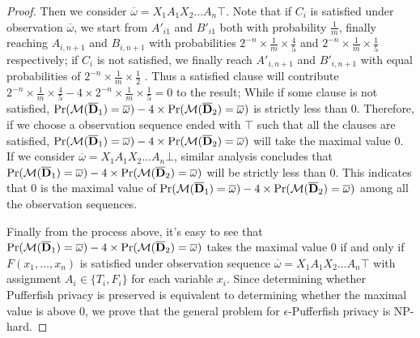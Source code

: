 \begin{proof}
  Then we consider $\overline{\omega}=X_1A_1X_2\ldots A_n \top$. Note that if $C_i$ is satisfied under observation $\overline{\omega}$, we start from $A'_{i1}$ and $B'_{i1}$ both with
  probability $\frac{1}{m}$, finally reaching $A_{i,n+1}$ and $B_{i,n+1}$ with probabilities $2^{-n} \times \frac{1}{m} \times \frac{4}{5}$
  and $2^{-n} \times \frac{1}{m} \times \frac{1}{5}$ respectively;
  if $C_i$ is not satisfied, we finally reach $A'_{i,n+1}$ and $B'_{i,n+1}$  with equal probabilities of $2^{-n}\times \frac{1}{m} \times \frac{1}{2}$ .
  Thus a satisfied clause will contribute $2^{-n} \times \frac{1}{m} \times \frac{4}{5} - 4 \times 2^{-n} \times \frac{1}{m} \times \frac{1}{5} = 0$ to
  the result; While if some clause is not satisfied, $\Pr (\mathcal{M} (\overline{\mathbf{D}}_1) = \overline{\omega})- 4\times \Pr (\mathcal{M} (\overline{\mathbf{D}}_2) = \overline{\omega})$ is strictly less than $0$.
  Therefore, if we choose a observation sequence ended with $\top$ such that all the
  clauses are satisfied, $\Pr (\mathcal{M} (\overline{\mathbf{D}}_1) = \overline{\omega})- 4\times \Pr (\mathcal{M} (\overline{\mathbf{D}}_2) = \overline{\omega})$ will take the maximal value 0.
  If we consider $\overline{\omega}=X_1A_1X_2\ldots A_n \bot$, similar analysis concludes that $\Pr (\mathcal{M} (\overline{\mathbf{D}}_1) = \overline{\omega}) - 4 \times \Pr (\mathcal{M} (\overline{\mathbf{D}}_2) = \overline{\omega})$
  will be strictly less than $0$.
  This indicates that $0$ is the maximal value of $\Pr (\mathcal{M} (\overline{\mathbf{D}}_1) = \overline{\omega}) - 4 \times \Pr (\mathcal{M} (\overline{\mathbf{D}}_2) = \overline{\omega})$
  among all the observation sequences.

  Finally from the process above, it's easy to see that
  $\Pr (\mathcal{M} (\overline{\mathbf{D}}_1) = \overline{\omega}) - 4 \times \Pr (\mathcal{M} (\overline{\mathbf{D}}_2) = \overline{\omega})$ takes the maximal value $0$
  if and only if $F(x_1,\ldots,x_n)$ is satisfied under observation sequence $\overline{\omega}=X_1A_1X_2\ldots A_n \top$
  with assignment $A_i \in \{T_i,F_i\}$ for each variable $x_i$.
  Since determining whether Pufferfish privacy is preserved
  is equivalent to determining whether the maximal value is above $0$,
  we prove that the general problem for $\epsilon$-Pufferfish privacy is NP-hard.

\end{proof} 